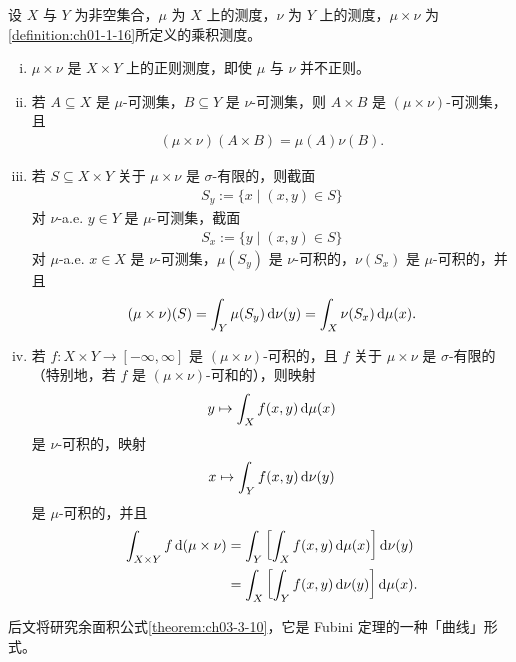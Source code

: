 \documentclass[../../main.tex]{subfiles}%
\begin{document}
\begin{theorem}[Fubini 定理]\label{theorem:ch01-1-22}
设 $X$ 与 $Y$ 为非空集合，$\mu$ 为 $X$ 上的测度，$\nu$ 为 $Y$ 上的测度，$\mu\times\nu$ 为\cref{definition:ch01-1-16}所定义的乘积测度。%
\begin{enumerate}[(i)]
\item $\mu\times\nu$ 是 $X\times Y$ 上的正则测度，即使 $\mu$ 与 $\nu$ 并不正则。
\item 若 $A\subseteq X$ 是 $\mu$-可测集，$B\subseteq Y$ 是 $\nu$-可测集，则 $A\times B$ 是 $(\mu\times\nu)$-可测集，且
\begin{align*}
(\mu\times\nu)(A\times B)=\mu(A)\nu(B).
\end{align*}
\item 若 $S\subseteq X\times Y$ 关于 $\mu\times\nu$ 是 $\sigma$-有限的，则截面
\begin{align*}
S_y:=\{x\mid(x,y)\in S\}
\end{align*}
对 $\nu$-a.e. $y\in Y$ 是 $\mu$-可测集，截面
\begin{align*}
S_x:=\{y\mid(x,y)\in S\}
\end{align*}
对 $\mu$-a.e. $x\in X$ 是 $\nu$-可测集，$\mu(S_y)$ 是 $\nu$-可积的，$\nu(S_x)$ 是 $\mu$-可积的，并且
\begin{align*}
(\mu\times\nu)(S)=\int_Y\mu(S_y)\,\mathrm{d}\nu(y)=\int_X\nu(S_x)\,\mathrm{d}\mu(x).
\end{align*}
\item 若 $f:X\times Y\to[-\infty,\infty]$ 是 $(\mu\times\nu)$-可积的，且 $f$ 关于 $\mu\times\nu$ 是 $\sigma$-有限的（特别地，若 $f$ 是 $(\mu\times\nu)$-可和的），则映射
\begin{align*}
y\mapsto\int_X f(x,y)\,\mathrm{d}\mu(x)
\end{align*}
是 $\nu$-可积的，映射
\begin{align*}
x\mapsto\int_Y f(x,y)\,\mathrm{d}\nu(y)
\end{align*}
是 $\mu$-可积的，并且
\begin{align*}
\int_{X\times Y}f\,\mathrm{d}(\mu\times\nu)&=\int_Y\left[\int_X f(x,y)\,\mathrm{d}\mu(x)\right]\mathrm{d}\nu(y)\\
&=\int_X\left[\int_Y f(x,y)\,\mathrm{d}\nu(y)\right]\mathrm{d}\mu(x).
\end{align*}
\end{enumerate}
\end{theorem}

\begin{remark}\label{remark:ch01-thm-1-22-余面积}
后文将研究余面积公式\cref{theorem:ch03-3-10}，它是 Fubini 定理的一种「曲线」形式。%
\end{remark}
\end{document}
